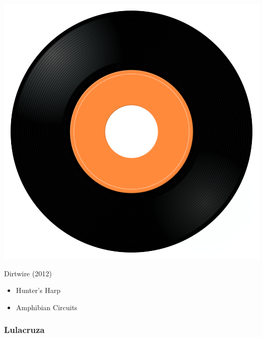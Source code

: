 \begin{minipage}[t]{0.25\textwidth}
\captionsetup{type=figure}
\includegraphics[width=\textwidth]{Images/cover.png}
\caption*{Dirtwire (2012)}
\end{minipage}
\begin{minipage}[t]{0.25\textwidth}\vspace{0pt}
\begin{itemize}[nosep,leftmargin=1em,labelwidth=*,align=left]
	\setlength{\itemsep}{0pt}
	\item Hunter's Harp
	\item Amphibian Circuits
\end{itemize}
\end{minipage}

\subsubsection{Lulacruza}

